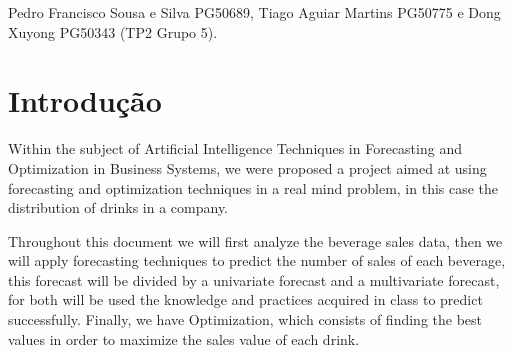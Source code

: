 \documentclass[9pt]{article}
\renewcommand{\quad}{\hspace{0.5cm}}
\begin{document}
Pedro Francisco Sousa e Silva PG50689, Tiago Aguiar Martins PG50775 e Dong Xuyong PG50343 (TP2 Grupo 5).

\section{Introdução}

\quad Within the subject of Artificial Intelligence Techniques in Forecasting and Optimization in Business Systems, we were proposed a project aimed at using forecasting and optimization techniques in a real mind problem, in this case the distribution of drinks in a company.

Throughout this document we will first analyze the beverage sales data, then we will apply forecasting techniques to predict the number of sales of each beverage, this forecast will be divided by a univariate forecast and a multivariate forecast, for both will be used the knowledge and practices acquired in class to predict successfully. Finally, we have Optimization, which consists of finding the best values in order to maximize the sales value of each drink.




\end{document}
